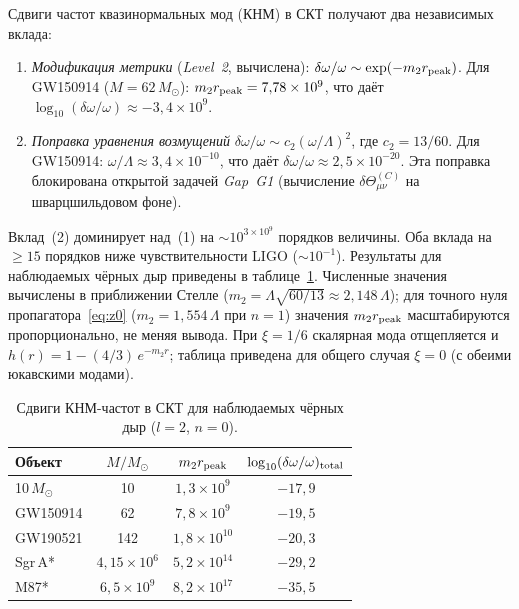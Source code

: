 \documentclass[12pt,a4paper]{article}
\theoremstyle{plain}
\theoremstyle{definition}
\theoremstyle{remark}
\begin{document}
Сдвиги частот квазинормальных мод (КНМ) в СКТ получают два
независимых вклада:
\begin{enumerate}
\item \emph{Модификация метрики} (\textit{Level~2}, вычислена):
  $\delta\omega/\omega \sim \exp(-m_2 r_{\rm peak})$.
  Для GW150914 ($M = 62\,M_\odot$): $m_2 r_{\rm peak} = 7{,}78 \times 10^9$,
  что даёт $\log_{10}(\delta\omega/\omega) \approx -3{,}4 \times 10^9$.
\item \emph{Поправка уравнения возмущений}
  $\delta\omega/\omega \sim c_2(\omega/\Lambda)^2$,
  где $c_2 = 13/60$. Для GW150914:
  $\omega/\Lambda \approx 3{,}4 \times 10^{-10}$, что даёт
  $\delta\omega/\omega \approx 2{,}5 \times 10^{-20}$.
  Эта поправка блокирована открытой задачей \textit{Gap~G1}
  (вычисление $\delta\Theta^{(C)}_{\mu\nu}$ на шварцшильдовом фоне).
\end{enumerate}
Вклад~(2) доминирует над~(1) на $\sim 10^{3 \times 10^9}$ порядков
величины. Оба вклада на $\geq 15$ порядков ниже чувствительности LIGO
($\sim 10^{-1}$). Результаты для наблюдаемых чёрных дыр приведены
в таблице~\ref{tab:qnm}. Численные значения вычислены в
приближении Стелле ($m_2 = \Lambda\sqrt{60/13} \approx 2{,}148\,\Lambda$);
для точного нуля пропагатора~\eqref{eq:z0}
($m_2 = 1{,}554\,\Lambda$ при $n=1$) значения $m_2 r_{\rm peak}$
масштабируются пропорционально, не меняя вывода.
При $\xi = 1/6$ скалярная мода отщепляется и $h(r) = 1 - (4/3)\,e^{-m_2 r}$;
таблица приведена для общего случая $\xi = 0$ (с обеими юкавскими
модами).

\begin{table}[h]
\centering
\caption{Сдвиги КНМ-частот в СКТ для наблюдаемых чёрных дыр ($l=2$, $n=0$).}
\label{tab:qnm}
\begin{tabular}{lccc}
\toprule
Объект & $M/M_\odot$ & $m_2 r_{\rm peak}$ &
  $\log_{10}(\delta\omega/\omega)_{\rm total}$ \\
\midrule
10\,$M_\odot$  & 10    & $1{,}3 \times 10^9$  & $-17{,}9$ \\
GW150914       & 62    & $7{,}8 \times 10^9$  & $-19{,}5$ \\
GW190521       & 142   & $1{,}8 \times 10^{10}$ & $-20{,}3$ \\
Sgr\,A*        & $4{,}15 \times 10^6$ & $5{,}2 \times 10^{14}$ & $-29{,}2$ \\
M87*           & $6{,}5 \times 10^9$ & $8{,}2 \times 10^{17}$ & $-35{,}5$ \\
\bottomrule
\end{tabular}
\end{table}
\end{document}
